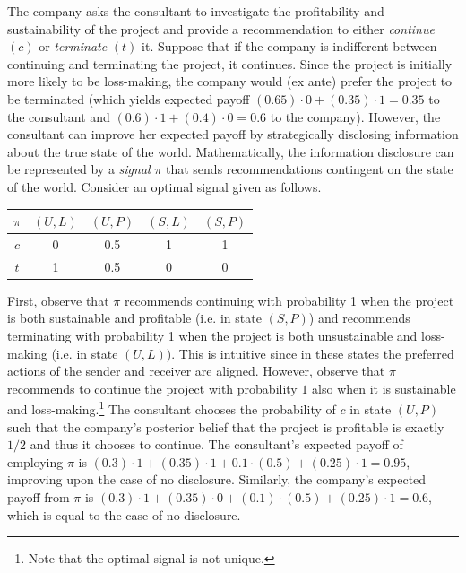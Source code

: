 \documentclass[12pt,english]{article}
\theoremstyle{plain}
\begin{document}
\noindent The company asks the consultant to investigate the profitability and sustainability of the project and provide a recommendation to either \emph{continue} $(c)$ or \emph{terminate} $(t)$ it. 
Suppose that if the company is indifferent between continuing and terminating the project, it continues. 
Since the project is initially more likely to be loss-making, the company would (ex ante) prefer the project to be terminated (which yields expected payoff $(0.65)\cdot 0+(0.35)\cdot 1=0.35$ to the consultant and $(0.6)\cdot 1+(0.4)\cdot 0=0.6$ to the company).
However, the consultant can improve her expected payoff by strategically disclosing information about the true state of the world. 
Mathematically, the information disclosure can be represented by a \emph{signal} $\pi$ that sends recommendations contingent on the state of the world. 
Consider an optimal signal given as follows.
\begin{table}[H]
\centering
\begin{tabular}{c|cccc}
$ \pi $ & $ (U,L) $ & $ (U,P) $ & $(S,L)$ & $(S,P)$ \\
\hline
$c$ & 0 & 0.5 & 1 & 1 \\[0.1cm]
$t$ & 1 & 0.5 & 0 & 0 
\end{tabular}
\end{table}

\noindent First, observe that $\pi$ recommends continuing with probability 1 when the project is both sustainable and profitable (i.e. in  state $(S,P)$) and recommends terminating with probability 1 when the project is both unsustainable and loss-making (i.e. in  state $(U,L)$). 
This is intuitive since in these states the preferred actions of the sender and receiver are aligned. 
However, observe that $\pi$ recommends to continue the project with probability $1$ also when it is sustainable and loss-making.\footnote{Note that the optimal signal is not unique.}
The consultant chooses the probability of $c$ in state $(U,P)$ such that the company's posterior belief that the project is profitable is exactly $1/2$ and thus it chooses to continue. 
The consultant's expected payoff of employing $\pi$ is $(0.3)\cdot 1+(0.35)\cdot 1+0.1\cdot (0.5)+(0.25)\cdot 1=0.95$, improving upon the case of no disclosure. 
Similarly, the company's expected payoff from $\pi$ is $(0.3)\cdot 1+(0.35)\cdot 0+(0.1)\cdot (0.5)+(0.25)\cdot 1=0.6$, which is equal to the case of no disclosure.
\end{document}
